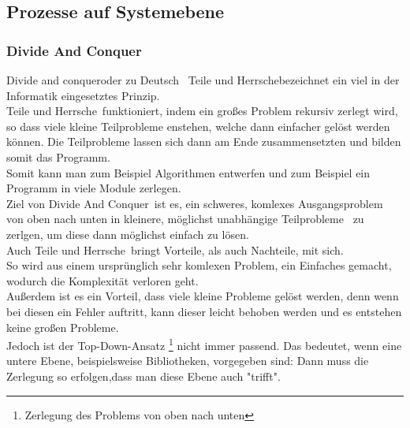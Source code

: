 \documentclass[a4paper, 10pt]{scrartcl}
\begin{document}
\subsection{Prozesse auf Systemebene}
\subsubsection{Divide And Conquer}
\glqq Divide and conquer\grqq oder zu Deutsch \glqq \ Teile und Herrsche\grqq bezeichnet ein viel in der Informatik eingesetztes Prinzip.\\
 \glqq Teile und Herrsche\grqq \ funktioniert, indem ein großes Problem rekursiv zerlegt wird, so dass viele kleine Teilprobleme enstehen, welche dann einfacher gelöst werden können. Die Teilprobleme lassen sich dann am Ende zusammensetzten und bilden somit das Programm.\\
Somit kann man zum Beispiel Algorithmen entwerfen und zum Beispiel ein Programm in viele Module zerlegen.\\
Ziel von \glqq Divide And Conquer\grqq\  ist es, ein schweres, komlexes Ausgangsproblem von oben nach unten \glqq in kleinere, möglichst unabhängige Teilprobleme\grqq \ \cite{goll_entwurfsprinzipien} zu zerlgen, um diese dann möglichst einfach zu lösen.\\
Auch \glqq Teile und Herrsche\grqq\  bringt Vorteile, als auch Nachteile, mit sich.\\
So wird aus einem ursprünglich sehr komlexen Problem, ein Einfaches gemacht, wodurch die Komplexität verloren geht.\\
Außerdem ist es ein Vorteil, dass viele kleine Probleme gelöst werden, denn wenn bei diesen ein Fehler auftritt, kann dieser leicht behoben werden und es entstehen keine großen Probleme.\\
Jedoch ist der Top-Down-Ansatz \footnote[2]{Zerlegung des Problems von oben nach unten} nicht immer passend. Das bedeutet, \glqq wenn eine untere Ebene, beispielsweise Bibliotheken, vorgegeben sind: Dann muss die Zerlegung so erfolgen,dass man diese Ebene auch "trifft".\grqq \ \cite{goll_entwurfsprinzipien}
\end{document}
